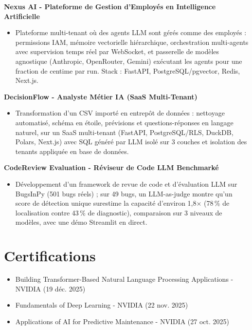 \documentclass[11pt,a4paper]{article}
\newcommand{\proj}[1]{\textbf{#1}\par}
\begin{document}
\proj{Nexus AI - Plateforme de Gestion d'Employés en Intelligence Artificielle}
\begin{itemize}
  \item Plateforme multi-tenant où des agents LLM sont gérés comme des employés : permissions IAM, mémoire
        vectorielle hiérarchique, orchestration multi-agents avec supervision temps réel par WebSocket, et
        passerelle de modèles agnostique (Anthropic, OpenRouter, Gemini) exécutant les agents pour une
        fraction de centime par run. Stack : FastAPI, PostgreSQL/pgvector, Redis, Next.js.
\end{itemize}

\proj{DecisionFlow - Analyste Métier IA (SaaS Multi-Tenant)}
\begin{itemize}
  \item Transformation d'un CSV importé en entrepôt de données : nettoyage automatisé, schéma en étoile,
        prévisions et questions-réponses en langage naturel, sur un SaaS multi-tenant (FastAPI,
        PostgreSQL/RLS, DuckDB, Polars, Next.js) avec SQL généré par LLM isolé sur 3 couches et isolation
        des tenants appliquée en base de données.
\end{itemize}

\proj{CodeReview Evaluation - Réviseur de Code LLM Benchmarké}
\begin{itemize}
  \item Développement d'un framework de revue de code et d'évaluation LLM sur BugsInPy (501 bugs réels) ;
        sur 49 bugs, un LLM-as-judge montre qu'un score de détection unique surestime la capacité
        d'environ 1,8$\times$ (78\,\% de localisation contre 43\,\% de diagnostic), comparaison sur 3 niveaux de
        modèles, avec une démo Streamlit en direct.
\end{itemize}

\section{Certifications}
\begin{itemize}
  \item Building Transformer-Based Natural Language Processing Applications - NVIDIA {\color{muted}(19 déc. 2025)}
  \item Fundamentals of Deep Learning - NVIDIA {\color{muted}(22 nov. 2025)}
  \item Applications of AI for Predictive Maintenance - NVIDIA {\color{muted}(27 oct. 2025)}
\end{itemize}
\end{document}
